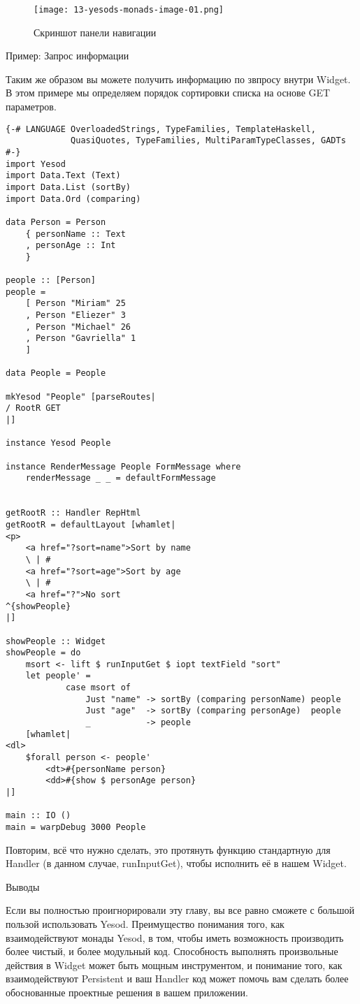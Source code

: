 \begin{figure}[tbh]
  \centering
  \caption{Скриншот панели навигации}
  \texttt{[image: 13-yesods-monads-image-01.png]}
\end{figure}

Пример: Запрос информации

Таким же образом вы можете получить информацию по звпросу внутри Widget. В этом примере мы определяем порядок сортировки списка на основе GET параметров.

\begin{lstlisting}
{-# LANGUAGE OverloadedStrings, TypeFamilies, TemplateHaskell,
             QuasiQuotes, TypeFamilies, MultiParamTypeClasses, GADTs #-}
import Yesod
import Data.Text (Text)
import Data.List (sortBy)
import Data.Ord (comparing)

data Person = Person
    { personName :: Text
    , personAge :: Int
    }

people :: [Person]
people =
    [ Person "Miriam" 25
    , Person "Eliezer" 3
    , Person "Michael" 26
    , Person "Gavriella" 1
    ]

data People = People

mkYesod "People" [parseRoutes|
/ RootR GET
|]

instance Yesod People

instance RenderMessage People FormMessage where
    renderMessage _ _ = defaultFormMessage


getRootR :: Handler RepHtml
getRootR = defaultLayout [whamlet|
<p>
    <a href="?sort=name">Sort by name
    \ | #
    <a href="?sort=age">Sort by age
    \ | #
    <a href="?">No sort
^{showPeople}
|]

showPeople :: Widget
showPeople = do
    msort <- lift $ runInputGet $ iopt textField "sort"
    let people' =
            case msort of
                Just "name" -> sortBy (comparing personName) people
                Just "age"  -> sortBy (comparing personAge)  people
                _           -> people
    [whamlet|
<dl>
    $forall person <- people'
        <dt>#{personName person}
        <dd>#{show $ personAge person}
|]

main :: IO ()
main = warpDebug 3000 People
\end{lstlisting}

Повторим, всё что нужно сделать, это протянуть функцию стандартную для Handler (в данном случае, runInputGet), чтобы исполнить её в нашем Widget.

Выводы

Если вы полностью проигнорировали эту главу, вы все равно сможете с большой пользой использовать Yesod. Преимущество понимания того, как взаимодействуют монады Yesod, в том, чтобы иметь возможность производить более чистый, и более модульный код. Способность выполнять произвольные действия в Widget может быть мощным инструментом, и понимание того, как взаимодействуют Persistent и ваш Handler код может помочь вам сделать более обоснованные проектные решения в вашем приложении.

